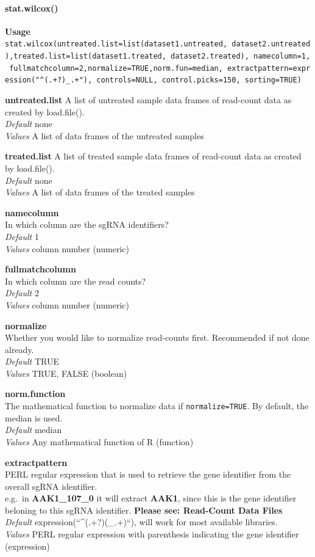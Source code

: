 \documentclass[]{article}
\let\oldparagraph\paragraph
\renewcommand{\paragraph}[1]{\oldparagraph{#1}\mbox{}}
\begin{document}
\paragraph{stat.wilcox()}\label{stat.wilcox}

\textbf{Usage}\\
\texttt{stat.wilcox(untreated.list=list(dataset1.untreated,\ dataset2.untreated),treated.list=list(dataset1.treated,\ dataset2.treated),\ namecolumn=1,\ fullmatchcolumn=2,normalize=TRUE,norm.fun=median,\ extractpattern=expression("\^{}(.+?)\_.+"),\ controls=NULL,\ control.picks=150,\ sorting=TRUE)}

\textbf{untreated.list} A list of untreated sample data frames of
read-count data as created by load.file().\\
\emph{Default} none\\
\emph{Values} A list of data frames of the untreated samples

\textbf{treated.list} A list of treated sample data frames of read-count
data as created by load.file().\\
\emph{Default} none\\
\emph{Values} A list of data frames of the treated samples

\textbf{namecolumn}\\
In which column are the sgRNA identifiers?\\
\emph{Default} 1\\
\emph{Values} column number (numeric)

\textbf{fullmatchcolumn}\\
In which column are the read counts?\\
\emph{Default} 2\\
\emph{Values} column number (numeric)

\textbf{normalize}\\
Whether you would like to normalize read-counts first. Recommended if
not done already.\\
\emph{Default} TRUE\\
\emph{Values} TRUE, FALSE (boolean)

\textbf{norm.function}\\
The mathematical function to normalize data if \texttt{normalize=TRUE}.
By default, the median is used.\\
\emph{Default} median\\
\emph{Values} Any mathematical function of R (function)

\textbf{extractpattern}\\
PERL regular expression that is used to retrieve the gene identifier
from the overall sgRNA identifier.\\
e.g.~in \textbf{AAK1\_107\_0} it will extract \textbf{AAK1}, since this
is the gene identifier beloning to this sgRNA identifier. \textbf{Please
see: Read-Count Data Files}\\
\emph{Default} expression(``\^{}(.+?)(\_.+)``), will work for most
available libraries.\\
\emph{Values} PERL regular expression with parenthesis indicating the
gene identifier (expression)
\end{document}
